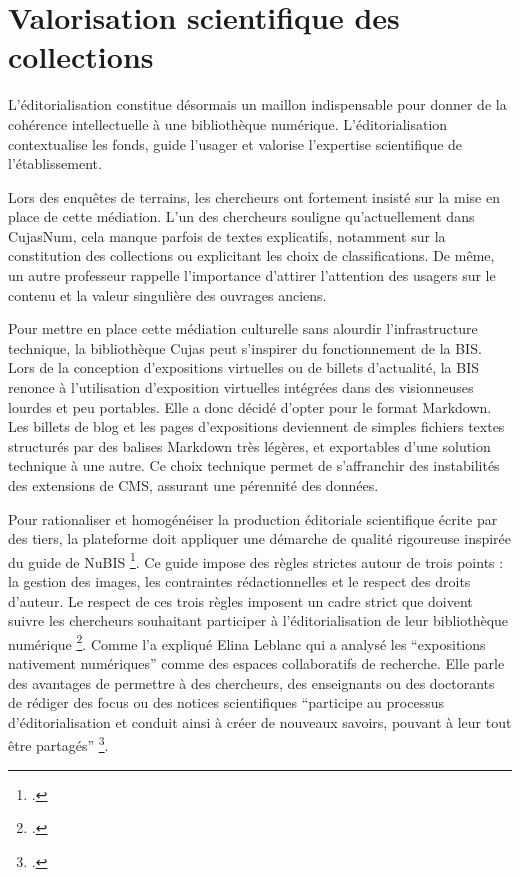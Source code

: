 \section{Valorisation scientifique des collections}
L'éditorialisation constitue désormais un maillon indispensable pour donner de la cohérence intellectuelle à une bibliothèque numérique. L'éditorialisation contextualise les fonds, guide l'usager et valorise l'expertise scientifique de l'établissement.

Lors des enquêtes de terrains, les chercheurs ont fortement insisté sur la mise en place de cette médiation. L'un des chercheurs souligne qu'actuellement dans CujasNum, cela manque parfois de textes explicatifs, notamment sur la constitution des collections ou explicitant les choix de classifications. De même, un autre professeur rappelle l'importance d'attirer l'attention des usagers sur le contenu et la valeur singulière des ouvrages anciens.

Pour mettre en place cette médiation culturelle sans alourdir l'infrastructure technique, la bibliothèque Cujas peut s'inspirer du fonctionnement de la BIS. Lors de la conception d'expositions virtuelles ou de billets d'actualité, la \ac{BIS} renonce à l'utilisation d'exposition virtuelles intégrées dans des visionneuses lourdes et peu portables. Elle a donc décidé d'opter pour le format Markdown. Les billets de blog et les pages d'expositions deviennent de simples fichiers textes structurés par des balises Markdown très légères, et exportables d'une solution technique à une autre. Ce choix technique permet de s'affranchir des instabilités des extensions de \ac{CMS}, assurant une pérennité des données.

Pour rationaliser et homogénéiser la production éditoriale scientifique écrite par des tiers, la plateforme doit appliquer une démarche de qualité rigoureuse inspirée du guide de NuBIS \footcite{sorbonneBlog2026}. Ce guide impose des règles strictes autour de trois points : la gestion des images, les contraintes rédactionnelles et le respect des droits d'auteur. Le respect de ces trois règles imposent un cadre strict que doivent suivre les chercheurs souhaitant participer à l'éditorialisation de leur bibliothèque numérique \footcite{sorbonneExpositionsVirtuelles}. Comme l'a expliqué Elina Leblanc qui a analysé les \enquote{expositions nativement numériques} comme des espaces collaboratifs de recherche. Elle parle des avantages de permettre à des chercheurs, des enseignants ou des doctorants de rédiger des focus ou des notices scientifiques \enquote{participe au processus d'éditorialisation et conduit ainsi à créer de nouveaux savoirs, pouvant à leur tout être partagés} \footcite{leblancBibliothequesNumeriquesEnrichies}.

